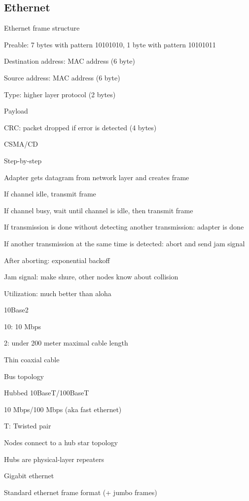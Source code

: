 \subsection{Ethernet}
\enumstart
	\item Ethernet frame structure
	\enumstart
		\item Preable: 7 bytes with pattern 10101010, 1 byte with pattern 10101011
		\item Destination address: MAC address (6 byte)
		\item Source address: MAC address (6 byte)
		\item Type: higher layer protocol (2 bytes)
		\item Payload
		\item CRC: packet dropped if error is detected (4 bytes)
	\enumend
	\item CSMA/CD
	\enumstart
		\item Step-by-step
		\enumstart
			\item Adapter gets datagram from network layer and creates frame
			\item If channel idle, transmit frame
			\item If channel busy, wait until channel is idle, then transmit frame
			\item If transmission is done without detecting another transmission: adapter is done
			\item If another transmission at the same time is detected: abort and send jam signal
			\item After aborting: exponential backoff
		\enumend
		\item Jam signal: make shure, other nodes know about collision
		\item Utilization: much better than aloha
	\enumend
	\item 10Base2
	\enumstart
		\item 10: 10 Mbps
		\item 2: under 200 meter maximal cable length
		\item Thin coaxial cable
		\item Bus topology
	\enumend
	\item Hubbed 10BaseT/100BaseT
	\enumstart
		\item 10 Mbps/100 Mbps (aka fast ethernet)
		\item T: Twisted pair
		\item Nodes connect to a hub \arrow star topology
		\item Hubs are physical-layer repeaters
	\enumend
	\item Gigabit ethernet
	\enumstart
		\item Standard ethernet frame format (+ jumbo frames)
	\enumend
\enumend
